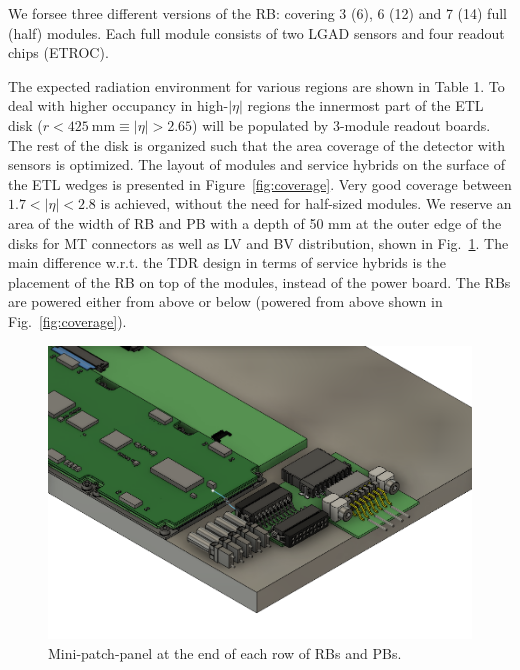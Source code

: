 \documentclass[11pt]{article}
\begin{document}
We forsee three different versions of the RB: covering 3 (6), 6 (12) and 7 (14) full (half) modules.
Each full module consists of two LGAD sensors and four readout chips (ETROC).

The expected radiation environment for various regions are shown in Table 1.
To deal with higher occupancy in high-$|\eta|$ regions the innermost part of the ETL disk ($r<425~\mathrm{mm} \equiv |\eta|>2.65$) will be populated by 3-module readout boards.
The rest of the disk is organized such that the area coverage of the detector with sensors is optimized.
The layout of modules and service hybrids on the surface of the ETL wedges is presented in Figure~\ref{fig:coverage}.
Very good coverage between $1.7<|\eta|<2.8$ is achieved, without the need for half-sized modules.
We reserve an area of the width of RB and PB with a depth of 50 mm at the outer edge of the disks for MT connectors as well as LV and BV distribution, shown in Fig.~\ref{fig:patchpanel}.
The main difference w.r.t. the TDR design in terms of service hybrids is the placement of the RB on top of the modules, instead of the power board.
The RBs are powered either from above or below (powered from above shown in Fig.~\ref{fig:coverage}).

\begin{figure}[!h]
\centering
\includegraphics[width=0.70 \textwidth]{figures/patch_panel_3D.png}
\caption{
Mini-patch-panel at the end of each row of RBs and PBs.
}
\label{fig:patchpanel}
\end{figure}
\end{document}
